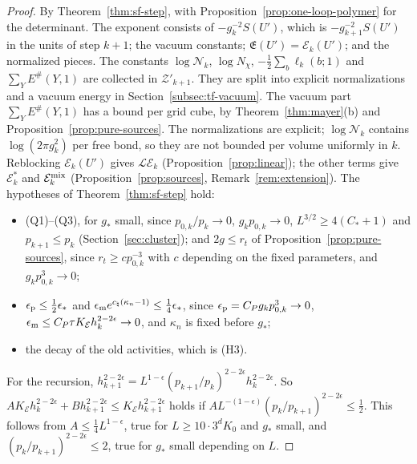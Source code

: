 \begin{proof}
By Theorem~\ref{thm:sf-step}, with Proposition~\ref{prop:one-loop-polymer} for the determinant. The exponent consists of $-g_k^{-2}S(U')$, which is $-g_{k+1}^{-2}S(U')$ in the units of step $k+1$; the vacuum constants; $\mathfrak E(U')=\mathcal E_k(U')$; and the normalized pieces. The constants $\log\mathcal N_k$, $\log N_\chi$, $-\frac12\sum_b\ell_k(b;1)$ and $\sum_YE^\#(Y,1)$ are collected in $\mathcal Z'_{k+1}$. They are split into explicit normalizations and a vacuum energy in Section~\ref{subsec:tf-vacuum}. The vacuum part $\sum_YE^\#(Y,1)$ has a bound per grid cube, by Theorem~\ref{thm:mayer}(b) and Proposition~\ref{prop:pure-sources}. The normalizations are explicit; $\log\mathcal N_k$ contains $\log(2\pi g_k^2)$ per free bond, so they are not bounded per volume uniformly in $k$. Reblocking $\mathcal E_k(U')$ gives $\mathcal L\mathcal E_k$ (Proposition~\ref{prop:linear}); the other terms give $\mathcal E^*_k$ and $\mathcal E^{\rm mix}_k$ (Proposition~\ref{prop:sources}, Remark~\ref{rem:extension}). The hypotheses of Theorem~\ref{thm:sf-step} hold:
\begin{itemize}
\item (Q1)--(Q3), for $g_*$ small, since $p_{0,k}/p_k\to0$, $g_kp_{0,k}\to0$, $L^{3/2}\ge4(C_*+1)$ and $p_{k+1}\le p_k$ (Section~\ref{sec:cluster}); and $2g\le r_t$ of Proposition~\ref{prop:pure-sources}, since $r_t\ge cp_{0,k}^{-3}$ with $c$ depending on the fixed parameters, and $g_kp_{0,k}^3\to0$;
\item $\epsilon_{\rm p}\le\frac12\epsilon_*$ and $\epsilon_{\rm m}e^{c_\natural(\kappa_n-1)}\le\frac14\epsilon_*$, since $\epsilon_{\rm p}=C_Pg_kp_{0,k}^3\to0$, $\epsilon_{\rm m}\le C_P\tau K_{\mathcal E}h_k^{2-2\epsilon}\to0$, and $\kappa_n$ is fixed before $g_*$;
\item the decay of the old activities, which is (H3).
\end{itemize}
For the recursion, $h_{k+1}^{2-2\epsilon}=L^{1-\epsilon}(p_{k+1}/p_k)^{2-2\epsilon}h_k^{2-2\epsilon}$. So $AK_{\mathcal E}h_k^{2-2\epsilon}+Bh_{k+1}^{2-2\epsilon}\le K_{\mathcal E}h_{k+1}^{2-2\epsilon}$ holds if $AL^{-(1-\epsilon)}(p_k/p_{k+1})^{2-2\epsilon}\le\frac12$. This follows from $A\le\frac14L^{1-\epsilon}$, true for $L\ge10\cdot3^dK_0$ and $g_*$ small, and $(p_k/p_{k+1})^{2-2\epsilon}\le2$, true for $g_*$ small depending on $L$.
\end{proof}

